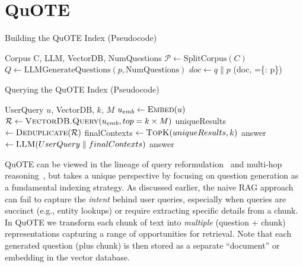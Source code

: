 


\section{QuOTE}

\begin{algorithm}[ht]
\caption{Building the QuOTE Index (Pseudocode)}
\label{algo:build-quote-index}
\begin{algorithmic}[1]
\Require Corpus C, LLM, VectorDB, NumQuestions
    \State $\mathcal{P} \gets \text{SplitCorpus}(C)$ 
        \State $Q \gets \text{LLMGenerateQuestions}(p,\text{NumQuestions})$
            \State $doc \gets q \| p$ 
            \State {}(doc, =\{: p\})
        \EndFor
    \EndFor
\EndFunction
\end{algorithmic}
\end{algorithm}

\begin{algorithm}[ht]
\caption{Querying the QuOTE Index (Pseudocode)}
\label{algo:quote-query}
\begin{algorithmic}[1]
\Require UserQuery $u$, VectorDB, $k$, $M$
\Statex
{}
    \State $u_{emb} \gets \Call{Embed}{u}$
    \State $\mathcal{R} \gets \Call{VectorDB.Query}{u_{emb}, top=k \times M}$
    \State uniqueResults $\gets \Call{Deduplicate}{\mathcal{R}}$
    \State finalContexts $\gets \Call{TopK}{uniqueResults, k}$
    \State answer $\gets \Call{LLM}{UserQuery \parallel finalContexts}$
    \State \Return answer
\EndFunction
\end{algorithmic}
\end{algorithm}




QuOTE can be viewed
in the lineage of
query reformulation~\cite{query-formulation-6}
and multi-hop reasoning~\cite{multi-hop-7}, but takes a unique perspective by focusing on question generation as a fundamental indexing strategy. 
As discussed earlier, the naive RAG approach can
fail to capture the \emph{intent} behind user queries, especially when queries are succinct 
(e.g., entity lookups) or require extracting specific details from a chunk. 
In QuOTE we transform
each chunk of text into \emph{multiple}
(question + chunk) representations
capturing a range of opportunities for retrieval.
Note that each generated question (plus chunk) is then stored as a separate ``document'' or embedding in the vector database. 


